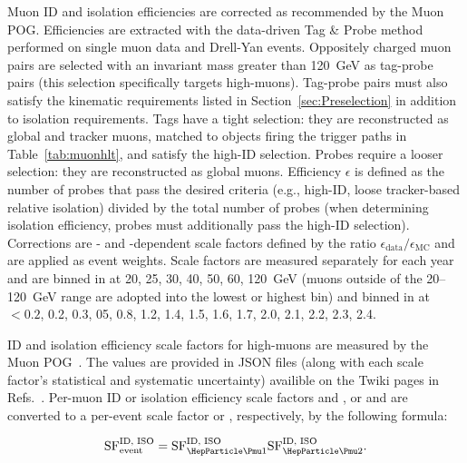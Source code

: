 Muon ID and isolation efficiencies are corrected as recommended by the Muon POG. Efficiencies are extracted with the data-driven Tag \& Probe method performed on single muon data and Drell-Yan events. Oppositely charged muon pairs are selected with an invariant mass greater than \SI{120}{\GeV} as tag-probe pairs (this selection specifically targets high-\pt muons). Tag-probe pairs must also satisfy the kinematic requirements listed in Section~\ref{sec:Preselection} in addition to isolation requirements. Tags have a tight selection: they are reconstructed as global and tracker muons, matched to objects firing the trigger paths in Table~\ref{tab:muonhlt}, and satisfy the high-\pt ID selection. Probes require a looser selection: they are reconstructed as global muons. Efficiency $\epsilon$ is defined as the number of probes that pass the desired criteria (e.g., high-\pt ID, loose tracker-based relative isolation) divided by the total number of probes (when determining isolation efficiency, probes must additionally pass the high-\pt ID selection). Corrections are \pt- and \pseudorap-dependent scale factors defined by the ratio $\epsilon_{\text{data}}/\epsilon_{\text{MC}}$ and are applied as event weights. Scale factors are measured separately for each year and are binned in \pt at 20, 25, 30, 40, 50, 60, \SI{120}{\GeV} (muons outside of the 20--\SI{120}{\GeV} range are adopted into the lowest or highest bin) and binned in \pseudorap at $ < 0.2$, 0.2, 0.3, 05, 0.8, 1.2, 1.4, 1.5, 1.6, 1.7, 2.0, 2.1, 2.2, 2.3, 2.4.

ID and isolation efficiency scale factors for high-\pt muons are measured by the Muon POG~\cite{MUO-17-001}\cite{AN-18-008}. The values are provided in JSON files (along with each scale factor's statistical and systematic uncertainty) availible on the Twiki pages in Refs.~\cite{MuonTwiki2016}\cite{MuonTwiki2017}\cite{MuonTwiki2018}. Per-muon ID or isolation efficiency scale factors  and , or  and  are converted to a per-event scale factor  or , respectively, by the following formula:

\begin{equation}
  \SF{ID, ISO}{event} = \SF{ID, ISO}{\PmuOne} \SF{ID, ISO}{\PmuTwo}.
\end{equation}